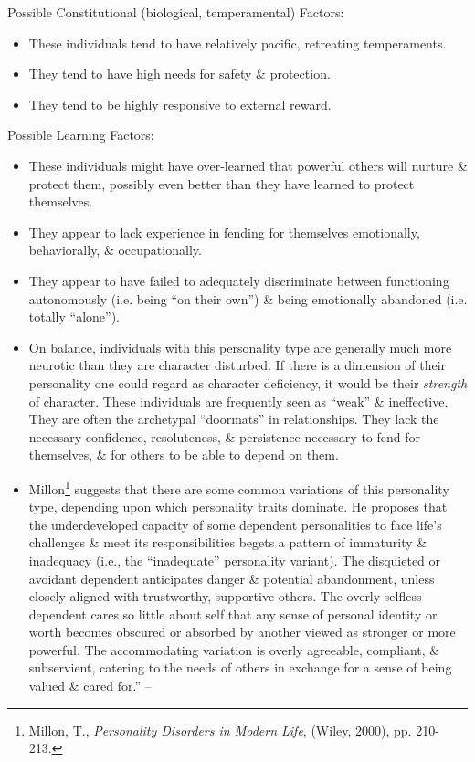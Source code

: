 \documentclass{article}
\numberwithin{equation}{section}
\begin{document}
Possible Constitutional (biological, temperamental) Factors:
\begin{itemize}
	\item These individuals tend to have relatively pacific, retreating temperaments.
	\item They tend to have high needs for safety \& protection.
	\item They tend to be highly responsive to external reward.
\end{itemize}
Possible Learning Factors:
\begin{itemize}
	\item These individuals might have over-learned that powerful others will nurture \& protect them, possibly even better than they have learned to protect themselves.
	\item They appear to lack experience in fending for themselves emotionally, behaviorally, \& occupationally.
	\item They appear to have failed to adequately discriminate between functioning autonomously (i.e. being ``on their own'') \& being emotionally abandoned (i.e. totally ``alone'').
	\item On balance, individuals with this personality type are generally much more neurotic than they are character disturbed. If there is a dimension of their personality one could regard as character deficiency, it would be their \textit{strength} of character. These individuals are frequently seen as ``weak'' \& ineffective. They are often the archetypal ``doormats'' in relationships. They lack the necessary confidence, resoluteness, \& persistence necessary to fend for themselves, \& for others to be able to depend on them.
	\item Millon\footnote{Millon, T., \textit{Personality Disorders in Modern Life}, (Wiley, 2000), pp. 210-213.} suggests that there are some common variations of this personality type, depending upon which personality traits dominate. He proposes that the underdeveloped capacity of some dependent personalities to face life's challenges \& meet its responsibilities begets a pattern of immaturity \& inadequacy (i.e., the ``inadequate'' personality variant). The disquieted or avoidant dependent anticipates danger \& potential abandonment, unless closely aligned with trustworthy, supportive others. The overly selfless dependent cares so little about self that any sense of personal identity or worth becomes obscured or absorbed by another viewed as stronger or more powerful. The accommodating variation is overly agreeable, compliant, \& subservient, catering to the needs of others in exchange for a sense of being valued \& cared for.'' -- \cite[p. 56--59]{Simon2011}
\end{itemize}
\end{document}
